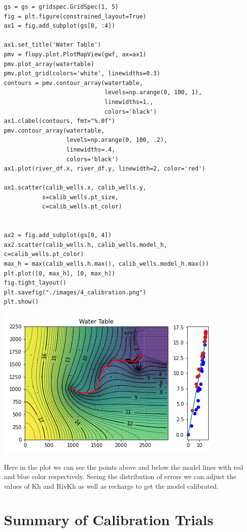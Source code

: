 \documentclass[titlepage,12pt]{unisubmission}
\begin{document}
\begin{verbatim}
gs = gs = gridspec.GridSpec(1, 5)
fig = plt.figure(constrained_layout=True)
ax1 = fig.add_subplot(gs[0, :4])

ax1.set_title('Water Table')
pmv = flopy.plot.PlotMapView(gwf, ax=ax1)
pmv.plot_array(watertable)
pmv.plot_grid(colors='white', linewidths=0.3)
contours = pmv.contour_array(watertable,
                             levels=np.arange(0, 100, 1),
                             linewidths=1.,
                             colors='black')
ax1.clabel(contours, fmt="%.0f")
pmv.contour_array(watertable,
                  levels=np.arange(0, 100, .2),
                  linewidths=.4,
                  colors='black')
ax1.plot(river_df.x, river_df.y, linewidth=2, color='red')

ax1.scatter(calib_wells.x, calib_wells.y,
           s=calib_wells.pt_size,
           c=calib_wells.pt_color)


ax2 = fig.add_subplot(gs[0, 4])
ax2.scatter(calib_wells.h, calib_wells.model_h, c=calib_wells.pt_color)
max_h = max(calib_wells.h.max(), calib_wells.model_h.max())
plt.plot([0, max_h], [0, max_h])
fig.tight_layout()
plt.savefig("./images/4_calibration.png")
plt.show()
\end{verbatim}

\begin{center}
\includegraphics[width=.9\linewidth]{./images/4_calibration.png}
\end{center}

Here in the plot we can see the points above and below the model lines with red and blue color respectively. Seeing the distribution of errors we can adjust the values of Kh and RivKh as well as recharge to get the model calibrated.

\section{Summary of Calibration Trials}
\label{sec:org57f2d98}
\end{document}
